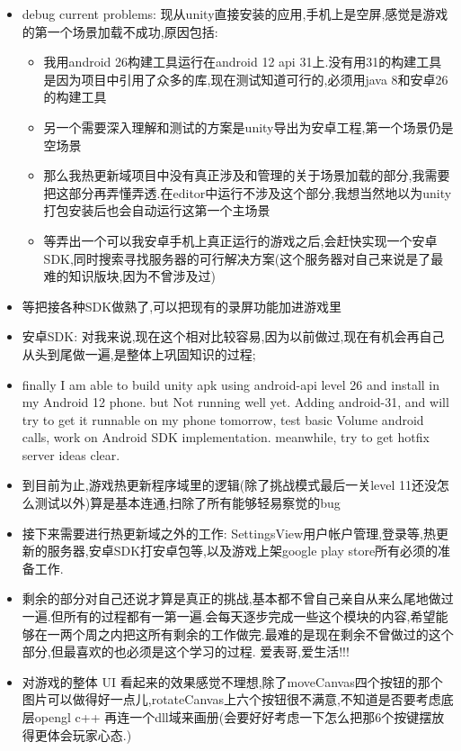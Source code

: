 \documentclass[9pt, b5paper]{article}
\begin{document}
\begin{itemize}
\item debug current problems: 现从unity直接安装的应用,手机上是空屏,感觉是游戏的第一个场景加载不成功,原因包括:
\begin{itemize}
\item 我用android 26构建工具运行在android 12 api 31上.没有用31的构建工具是因为项目中引用了众多的库,现在测试知道可行的,必须用java 8和安卓26的构建工具
\item 另一个需要深入理解和测试的方案是unity导出为安卓工程,第一个场景仍是空场景
\item 那么我热更新域项目中没有真正涉及和管理的关于场景加载的部分,我需要把这部分再弄懂弄透.在editor中运行不涉及这个部分,我想当然地以为unity打包安装后也会自动运行这第一个主场景
\item 等弄出一个可以我安卓手机上真正运行的游戏之后,会赶快实现一个安卓SDK,同时搜索寻找服务器的可行解决方案(这个服务器对自己来说是了最难的知识版块,因为不曾涉及过)
\end{itemize}
\item 等把接各种SDK做熟了,可以把现有的录屏功能加进游戏里
\item 安卓SDK: 对我来说,现在这个相对比较容易,因为以前做过,现在有机会再自己从头到尾做一遍,是整体上巩固知识的过程;
\item finally I am able to build unity apk using android-api level 26 and install in my Android 12 phone. but Not running well yet. Adding android-31, and will try to get it runnable on my phone tomorrow, test basic Volume android calls, work on Android SDK implementation. meanwhile, try to get hotfix server ideas clear.
\item 到目前为止,游戏热更新程序域里的逻辑(除了挑战模式最后一关level 11还没怎么测试以外)算是基本连通,扫除了所有能够轻易察觉的bug
\item 接下来需要进行热更新域之外的工作: SettingsView用户帐户管理,登录等,热更新的服务器,安卓SDK打安卓包等,以及游戏上架google play store所有必须的准备工作.
\item 剩余的部分对自己还说才算是真正的挑战,基本都不曾自己亲自从来么尾地做过一遍.但所有的过程都有一第一遍.会每天逐步完成一些这个模块的内容,希望能够在一两个周之内把这所有剩余的工作做完.最难的是现在剩余不曾做过的这个部分,但最喜欢的也必须是这个学习的过程. 爱表哥,爱生活!!!
\item 对游戏的整体 UI 看起来的效果感觉不理想,除了moveCanvas四个按钮的那个图片可以做得好一点儿,rotateCanvas上六个按钮很不满意,不知道是否要考虑底层opengl c++ 再连一个dll域来画册(会要好好考虑一下怎么把那6个按键摆放得更体会玩家心态.)
\end{itemize}
\end{document}
